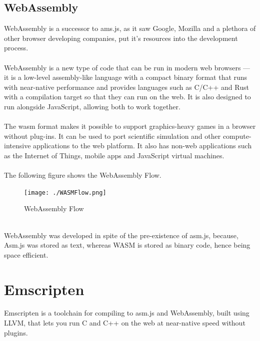 \documentclass[12pt]{article}
\begin{document}
\pagebreak

\subsection{WebAssembly}
WebAssembly is a successor to ams.js, as it saw Google, Mozilla and a plethora of other browser developing companies, put it’s resources into the development process.
\\
\\
WebAssembly is a new type of code that can be run in modern web browsers — it is a low-level assembly-like language with a compact binary format that runs with near-native performance and provides languages such as C/C++ and Rust with a compilation target so that they can run on the web. It is also designed to run alongside JavaScript, allowing both to work together.
\\
\\
The wasm format makes it possible to support graphics-heavy games in a browser without plug-ins. It can be used to port scientific simulation and other compute-intensive applications to the web platform. It also has non-web applications such as the Internet of Things, mobile apps and JavaScript virtual machines. \cite{WASMInfo}
\\
\\
The following figure shows the WebAssembly Flow.
\begin{figure}[h]
 \centering
 \texttt{[image: ./WASMFlow.png]}
 \caption{WebAssembly Flow\label{fig:WASMFlow}}
\end{figure}
\\
WebAssembly was developed in spite of the pre-existence of asm.js, because, Asm.js was stored as text, whereas WASM is stored as binary code, hence being space efficient.
\pagebreak

\section{Emscripten}
Emscripten is a toolchain for compiling to asm.js and WebAssembly, built using LLVM, that lets you run C and C++ on the web at near-native speed without plugins.\cite{EmscriptenCommon}
\end{document}
